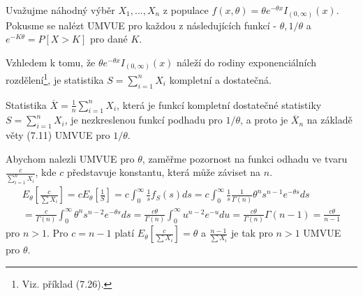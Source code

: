 \begin{example}
Uvažujme náhodný výběr $X_1, ..., X_n$ z populace $f(x, \theta) = \theta e^{-\theta x}I_{(0, \infty)}(x)$. Pokusme se nalézt UMVUE pro každou z následujících funkcí - $\theta, 1 / \theta$ a $e^{-K \theta} = P[X > K]$ pro dané $K$.

Vzhledem k tomu, že $\theta e^{-\theta x}I_{(0, \infty)}(x)$ náleží do rodiny exponenciálních rozdělení\footnote{Viz. příklad (7.26).}, je statistika $S = \sum_{i = 1}^n X_i$ kompletní a dostatečná.

Statistika $\overline{X} = \frac{1}{n}\sum_{i = 1}^n X_i$, která je funkcí kompletní dostatečné statistiky $S = \sum_{i = 1}^n X_i$, je nezkreslenou funkcí podhadu pro $1/\theta$, a proto je $\overline{X}_n$ na základě věty (7.11) UMVUE pro $1/\theta$.

Abychom nalezli UMVUE pro $\theta$, zaměřme pozornost na funkci odhadu ve tvaru $\frac{c}{\sum_{i = 1}^n X_i}$, kde $c$ představuje konstantu, která může záviset na $n$.
\begin{gather*}
E_{\theta}\left[\frac{c}{\sum X_i}\right] = c E_{\theta}\left[\frac{1}{S}\right] = c \int_0^{\infty} \frac{1}{s}f_S(s)ds = c \int_0^{\infty} \frac{1}{s} \frac{1}{\Gamma(n)}\theta^n s^{n-1}e^{-\theta s}ds\\
= \frac{c}{\Gamma(n)}\int_0^{\infty} \theta^n s^{n - 2}e^{-\theta s}ds = \frac{c \theta}{\Gamma(n)}\int_0^{\infty}u^{n - 2}e^{-u}du = \frac{c \theta}{\Gamma(n)}\Gamma(n - 1) = \frac{c \theta}{n - 1}
\end{gather*}
pro $n > 1$. Pro $c = n - 1$ platí $E_{\theta}\left[\frac{c}{\sum X_i}\right] = \theta$ a $\frac{n - 1}{\sum X_i}$ je tak pro $n > 1$ UMVUE pro $\theta$.


\end{example}
